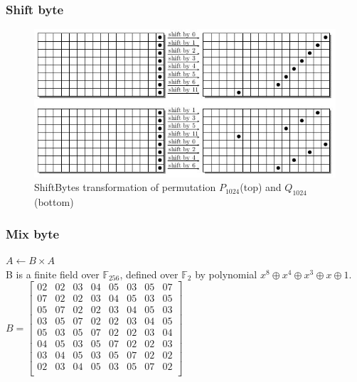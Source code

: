 \documentclass{beamer}
\begin{document}
\begin{frame}
\frametitle{Shift byte}
\begin{figure}[h]
  \begin{center}
    \includegraphics[scale=0.5]{groestl1024shift.jpg}
  \end{center}
  \caption{ShiftBytes transformation of permutation $P_{1024}$(top) and $Q_{1024}$(bottom)\footnotemark}
  \label{fig:lab}
\end{figure}
\end{frame}

\begin{frame}
\frametitle{Mix byte}
$ A \gets B \times A$ \\
B is a finite field over $\mathbb{F}_{256}$, 
defined over $\mathbb{F}_{2}$ by polynomial $x^{8} \oplus x^{4} \oplus x^{3} \oplus x \oplus 1$. \\
\vspace{3mm}
$B = \begin{bmatrix}
02 & 02 & 03 & 04 & 05 & 03 & 05 & 07 \\
07 & 02 & 02 & 03 & 04 & 05 & 03 & 05 \\
05 & 07 & 02 & 02 & 03 & 04 & 05 & 03 \\
03 & 05 & 07 & 02 & 02 & 03 & 04 & 05 \\
05 & 03 & 05 & 07 & 02 & 02 & 03 & 04 \\
04 & 05 & 03 & 05 & 07 & 02 & 02 & 03 \\
03 & 04 & 05 & 03 & 05 & 07 & 02 & 02 \\
02 & 03 & 04 & 05 & 03 & 05 & 07 & 02 \\
\end{bmatrix}$
\end{frame}
\end{document}
